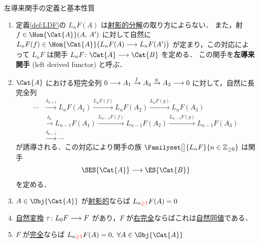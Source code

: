 \documentclass[algtopo_main]{subfiles}
\begin{document}
\begin{myprop}[label=def:LDF-basic, breakable]{左導来関手の定義と基本性質}
    \begin{enumerate}
        \item 定義\ref{def:LDF}の $L_nF(A)$ は\hyperref[def:projective-resolution]{射影的分解}の取り方によらない．
        また，射 $f \in \Hom{\Cat{A}}(A,\, A')$ に対して自然に $L_n F(f) \in \Hom{\Cat{A}}\bigl(L_nF(A) \lto L_nF(A') \bigr)$ が定まり，この対応によって $L_n F$ は関手 $L_n F \colon \Cat{A} \lto \Cat{B}$ を定める．
        この関手を\textbf{左導来関手} (left derived functor) と呼ぶ．
        \item $\Cat{A}$ における短完全列 $0\longrightarrow A_1 \xrightarrow{f} A_2 \xrightarrow{g} A_3 \longrightarrow 0$ に対して，自然に長完全列
        \begin{align}
            \cdots &\xrightarrow{\delta_{n+1}} L_nF(A_1) \xrightarrow{L_nF(f)} L_nF(A_2) \xrightarrow{L_nF(g)} L_nF(A_3) \\
                &\xrightarrow{\delta_{n}} L_{n-1}F(A_1) \xrightarrow{L_{n-1}F(f)} L_{n-1}F(A_2) \xrightarrow{L_{n-1}F(g)} L_{n-1}F(A_3) \\
                &\xrightarrow{\delta_{n-1}} \cdots 
        \end{align}
        が誘導される．この対応により関手の族 $\Familyset[\big]{L_nF}{n \in \mathbb{Z}_{\ge 0}}$ は関手
        \begin{align}
            \SES{\Cat{A}} \lto \ES{\Cat{B}}
        \end{align}
        を定める．
        \item $A \in \Obj{\Cat{A}}$ が\hyperref[def:proj-mod]{射影的}ならば $L_{n \textcolor{red}{\ge 1}}F(A) = 0$
        \item \hyperref[def:nat]{自然変換} $\tau\colon L_0 F \longrightarrow F$ があり，$F$ が\hyperref[def:Ab-func]{右完全}ならばこれは\hyperref[def:naturallyeq]{自然同値}である．
        \item $F$ が\hyperref[def:Ab-func]{完全}ならば $L_{n \textcolor{red}{\ge 1}}F(A) = 0,\; \forall A \in \Obj{\Cat{A}}$
    \end{enumerate}
\end{myprop}
\end{document}
